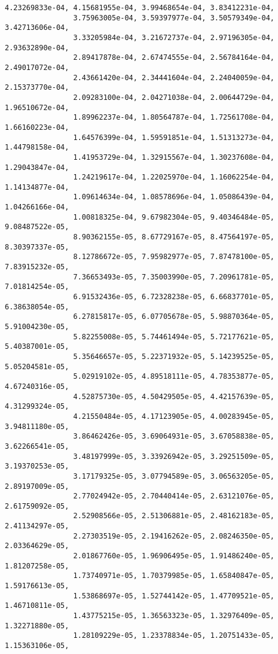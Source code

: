\documentclass[11pt]{article}
\begin{document}
\begin{Verbatim}[commandchars=\\\{\}]
                4.23269833e-04, 4.15681955e-04, 3.99468654e-04, 3.83412231e-04,
                3.75963005e-04, 3.59397977e-04, 3.50579349e-04, 3.42713606e-04,
                3.33205984e-04, 3.21672737e-04, 2.97196305e-04, 2.93632890e-04,
                2.89417878e-04, 2.67474555e-04, 2.56784164e-04, 2.49017072e-04,
                2.43661420e-04, 2.34441604e-04, 2.24040059e-04, 2.15373770e-04,
                2.09283100e-04, 2.04271038e-04, 2.00644729e-04, 1.96510672e-04,
                1.89962237e-04, 1.80564787e-04, 1.72561708e-04, 1.66160223e-04,
                1.64576399e-04, 1.59591851e-04, 1.51313273e-04, 1.44798158e-04,
                1.41953729e-04, 1.32915567e-04, 1.30237608e-04, 1.29043847e-04,
                1.24219617e-04, 1.22025970e-04, 1.16062254e-04, 1.14134877e-04,
                1.09614634e-04, 1.08578696e-04, 1.05086439e-04, 1.04266166e-04,
                1.00818325e-04, 9.67982304e-05, 9.40346484e-05, 9.08487522e-05,
                8.90362155e-05, 8.67729167e-05, 8.47564197e-05, 8.30397337e-05,
                8.12786672e-05, 7.95982977e-05, 7.87478100e-05, 7.83915232e-05,
                7.36653493e-05, 7.35003990e-05, 7.20961781e-05, 7.01814254e-05,
                6.91532436e-05, 6.72328238e-05, 6.66837701e-05, 6.38638054e-05,
                6.27815817e-05, 6.07705678e-05, 5.98870364e-05, 5.91004230e-05,
                5.82255008e-05, 5.74461494e-05, 5.72177621e-05, 5.40387001e-05,
                5.35646657e-05, 5.22371932e-05, 5.14239525e-05, 5.05204581e-05,
                5.02919102e-05, 4.89518111e-05, 4.78353877e-05, 4.67240316e-05,
                4.52875730e-05, 4.50429505e-05, 4.42157639e-05, 4.31299324e-05,
                4.21550484e-05, 4.17123905e-05, 4.00283945e-05, 3.94811180e-05,
                3.86462426e-05, 3.69064931e-05, 3.67058838e-05, 3.62266541e-05,
                3.48197999e-05, 3.33926942e-05, 3.29251509e-05, 3.19370253e-05,
                3.17179325e-05, 3.07794589e-05, 3.06563205e-05, 2.89197009e-05,
                2.77024942e-05, 2.70440414e-05, 2.63121076e-05, 2.61759092e-05,
                2.52908566e-05, 2.51306881e-05, 2.48162183e-05, 2.41134297e-05,
                2.27303519e-05, 2.19416262e-05, 2.08246350e-05, 2.03364629e-05,
                2.01867760e-05, 1.96906495e-05, 1.91486240e-05, 1.81207258e-05,
                1.73740971e-05, 1.70379985e-05, 1.65840847e-05, 1.59176613e-05,
                1.53868697e-05, 1.52744142e-05, 1.47709521e-05, 1.46710811e-05,
                1.43775215e-05, 1.36563323e-05, 1.32976409e-05, 1.32271880e-05,
                1.28109229e-05, 1.23378834e-05, 1.20751433e-05, 1.15363106e-05,

\end{Verbatim}
\end{document}
